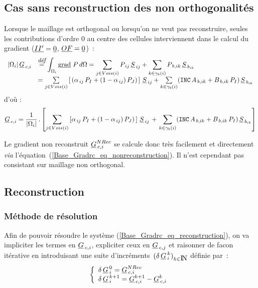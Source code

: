 \subsection{\bf Cas sans reconstruction des non orthogonalit\'es}
Lorsque le maillage est orthogonal ou lorsqu'on ne veut pas reconstruire, seules
les contributions d'ordre 0 au centre des cellules interviennent dans le
calcul du gradient ($\underline{II'} = \underline{0}$, $\underline{OF} = \underline{0}$)~:
\begin{equation}\notag
\begin{array}{ll}
|\Omega_i|\,\underline{G}_{\,c,i}&\overset{\text{\it\small d\'ef}}{=} \displaystyle\int_{\Omega_i}{\text{g}\underline{\text{rad}}\ {P}\, d\Omega}
=\sum\limits_{j\in Vois(i)}P_{\,ij}\,{\underline{S}_{\,ij}} + \sum\limits_{k\in {\gamma_b(i)}} P_{\,b,ik}\,\underline{S}_{\,{b}_{ik}} \\
 &= \sum\limits_{j\in Vois(i)}\left[\,(\alpha_{\,ij}\,P_I +
(1 - \alpha_{\,ij})\,P_J)\,\right]\,{\underline{S}_{\,ij}}
+ \sum\limits_{k\in {\gamma_b(i)}} (\text{\texttt{INC}}\,A_{\,b,ik} + B_{\,b,ik}\,P_I )\,\underline{S}_{\,{b}_{ik}}\\
\end{array}
\end{equation}
d'o\`u :
\begin{multline}\label{Base_Gradrc_eq_nonreconstruction}
\underline{G}_{\,c,i}=\frac{1}{|\Omega_i|}\,.\left[\sum\limits_{j\in
Vois(i)}\left[\alpha_{\,ij}\,P_I + (1 - \alpha_{\,ij})\,P_J)\, \right]\,{\underline{S}_{\,ij}}\right.
+\left.\sum\limits_{k\in {\gamma_b(i)}}(\text{\texttt{INC}}\,A_{\,b,ik} + B_{\,b,ik}\,P_I
)\,\underline{S}_{\,{b}_{ik}} \right]
\end{multline}

Le gradient non reconstruit $ \underline{G}_{\,c,i}^{NRec} $ se calcule donc tr\`es
facilement et directement {\it via} l'\'equation~(\ref{Base_Gradrc_eq_nonreconstruction}).
Il n'est cependant pas consistant sur maillage non orthogonal.

\subsection{\bf Reconstruction}
\subsubsection{\bf M\'ethode de r\'esolution}

Afin de pouvoir r\'esoudre le syst\`eme (\ref{Base_Gradrc_eq_reconstruction}), on va
impliciter les termes en $\underline{G}_{\,c,i}$, expliciter ceux en
$\underline{G}_{\,c,j}$ et raisonner de facon it\'erative en introduisant une suite
d'incr\'ements~$(\delta\,\underline{G}^{\,k}_{\,i})_{k\in \mbox{I\hspace{-.15em}N}}$ d\'efinie par~:\\
\begin{equation}
\left\{\begin{array}{l}
\delta\,\underline{G}^{\,0}_{\,i} = \underline{G}_{\,c,i}^{NRec}\\
\delta\,\underline{G}^{\,k+1}_{\,i} = \underline{G}^{k+1}_{\,c,i}-\underline{G}^k_{\,c,i}  \end{array}\right.
\end{equation}

